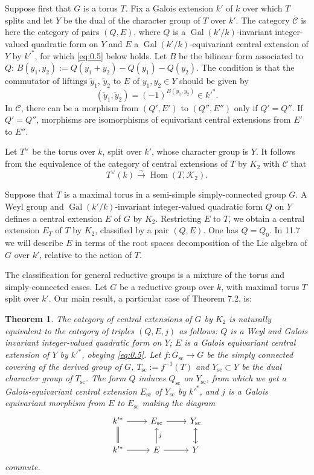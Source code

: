 \documentclass[11pt,a4paper]{article}
\theoremstyle{plain}
\newtheorem{theorem}{Theorem}[section]
\theoremstyle{definition}
\DeclareMathOperator{\Hom}{Hom}
\DeclareMathOperator{\Gal}{Gal}
\newcommand{\cC}{\mathcal{C}}
\newcommand{\cK}{\mathcal{K}}
\newcommand{\scu}{\mathrm{sc}}
\begin{document}
Suppose first that $G$ is a torus $T$. Fix a Galois extension $k'$ of $k$ over which $T$ splits and let $Y$ be the dual of the character group of $T$ over $k'$. The category $\cC$ is here the category of pairs $(Q,E)$, where $Q$ is a $\Gal(k'/k)$-invariant integer-valued quadratic form on $Y$ and $E$ a $\Gal(k'/k)$-equivariant central extension of $Y$ by $k'^*$, for which \eqref{eq:0.5} below holds. Let $B$ be the bilinear form associated to $Q$: $B(y_1, y_2) := Q(y_1+y_2) - Q(y_1) - Q(y_2)$. The condition is that the commutator of liftings $\tilde{y}_1$, $\tilde{y}_2$ to $E$ of $y_1, y_2 \in Y$ should be given by
\begin{equation}\label{eq:0.5}
(\tilde{y}_1, \tilde{y}_2) = (-1)^{B(y_1, y_2)} \in k'^*.
\end{equation}
In $\cC$, there can be a morphism from $(Q', E')$ to $(Q'', E'')$ only if $Q' = Q''$. If $Q' = Q''$, morphisms are isomorphisms of equivariant central extensions from $E'$ to $E''$.

Let $T^\vee$ be the torus over $k$, split over $k'$, whose character group is $Y$. It follows from the equivalence of the category of central extensions of $T$ by $K_2$ with $\cC$ that
\[T^\vee(k) \xrightarrow{\sim} \Hom(T, \cK_2).\]

Suppose that $T$ is a maximal torus in a semi-simple simply-connected group $G$. A Weyl group and $\Gal(k'/k)$-invariant integer-valued quadratic form $Q$ on $Y$ defines a central extension $E$ of $G$ by $K_2$. Restricting $E$ to $T$, we obtain a central extension $E_T$ of $T$ by $K_2$, classified by a pair $(Q, E)$. One has $Q = Q_0$. In 11.7 we will describe $E$ in terms of the root spaces decomposition of the Lie algebra of $G$ over $k'$, relative to the action of $T$.

The classification for general reductive groups is a mixture of the torus and simply-connected cases. Let $G$ be a reductive group over $k$, with maximal torus $T$ split over $k'$. Our main result, a particular case of Theorem 7.2, is:

\begin{theorem}
The category of central extensions of $G$ by $K_2$ is naturally equivalent to the category of triples $(Q, E, j)$ as follows: $Q$ is a Weyl and Galois invariant integer-valued quadratic form on $Y$; $E$ is a Galois equivariant central extension of $Y$ by $k'^*$, obeying \eqref{eq:0.5}. Let $f: G_{\scu} \to G$ be the simply connected covering of the derived group of $G$, $T_{\scu} := f^{-1}(T)$ and $Y_{\scu} \subset Y$ be the dual character group of $T_{\scu}$. The form $Q$ induces $Q_{\scu}$ on $Y_{\scu}$, from which we get a Galois-equivariant central extension $E_{\scu}$ of $Y_{\scu}$ by $k'^*$, and $j$ is a Galois equivariant morphism from $E$ to $E_{\scu}$ making the diagram
\[
\begin{tikzcd}
k'^* \arrow[r] \arrow[d, equal] & E_{\scu} \arrow[r] & Y_{\scu} \arrow[d] \\
k'^* \arrow[r] & E \arrow[r] \arrow[u, "j"'] & Y \arrow[u]
\end{tikzcd}
\]
commute.
\end{theorem}
\end{document}
